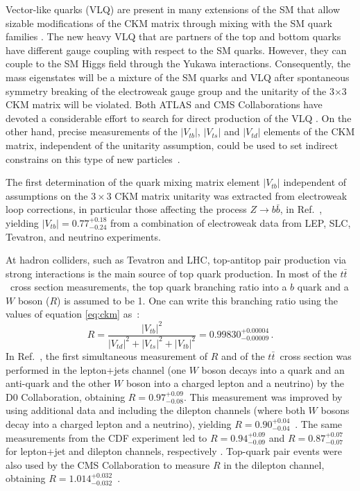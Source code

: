 \documentclass[11pt]{article}
\newcommand{\VTD}{|V_{td}|}
\newcommand{\VTS}{|V_{ts}|}
\newcommand{\VTB}{|V_{tb}|}
\newcommand{\ttbar}{$t\bar{t}$~}
\begin{document}
Vector-like quarks (VLQ)  are present in many extensions of the SM that allow sizable modifications of the CKM matrix through mixing with the SM quark families \cite{Cacciapaglia:2015ixa,Cacciapaglia:2011fx}. The new heavy VLQ that are partners of the top and bottom quarks have different gauge coupling with respect to the SM quarks. However, they can couple to the SM Higgs field through the Yukawa interactions. Consequently, the mass eigenstates  will be a mixture of the SM quarks and VLQ after spontaneous symmetry breaking of the electroweak gauge group and the unitarity of the 3$\times$3 CKM matrix will be violated. Both ATLAS and CMS Collaborations have devoted a considerable effort to search for direct production of the VLQ \cite{twikiATLAS,twikiCMS}. On the other hand, precise measurements of the   $\VTB$, $\VTS$ and $\VTD$ elements of the CKM matrix, independent of the unitarity assumption, could be used to set indirect constrains on this type of new particles~\cite{Cacciapaglia:2015ixa,Cacciapaglia:2011fx}.

The first determination of the quark mixing matrix element $\VTB$ independent of assumptions on the  $3\times 3$ CKM matrix
 unitarity was extracted from electroweak loop corrections, in particular those affecting the process $Z\rightarrow b\bar b$, in Ref.~\cite{Swain:1997mx}, yielding $\VTB = 0.77^{+0.18}_{-0.24}$  from a combination of electroweak data  from  LEP,  SLC,  Tevatron, and  neutrino  experiments.

 At hadron colliders, such as Tevatron and LHC,  top-antitop pair production via strong interactions is  the main source of top quark production. In most of the \ttbar  cross section measurements, the top quark branching ratio into a $b$ quark and a $W$ boson ($R$) is assumed to be 1. One can write this branching ratio using the values of equation \ref{eq:ckm} as~\cite{Patrignani:2016xqp}:
 \begin{equation}
R=\frac{|V_{tb}|^{2}}{|V_{td}|^{2}+|V_{ts}|^{2}+|V_{tb}|^{2}}=0.99830^{+0.00004}_{-0.00009} \,.
\end{equation}
In Ref.~\cite{Abazov:2008yn}, the first simultaneous measurement of $R$ and of the \ttbar  cross section was performed in  the lepton+jets channel (one $W$ boson decays  into a quark and an anti-quark and the other
$W$ boson into a charged lepton and a neutrino) by the D0 Collaboration, obtaining $R = 0.97^{+0.09}_{-0.08}$.
This measurement was improved by using additional  data and including the dilepton channels (where both $W$ bosons decay into a charged lepton and a neutrino), yielding $R = 0.90^{+0.04}_{-0.04}$~\cite{Abazov:2011zk}. The same measurements from the CDF experiment led to $R = 0.94^{+0.09}_{-0.09}$ and $R = 0.87^{+0.07}_{-0.07}$ for lepton+jet and dilepton channels, respectively \cite{Aaltonen:2013luz,Aaltonen:2014yua}. Top-quark pair events were also used by the CMS Collaboration to measure $R$ in the dilepton channel, obtaining $R = 1.014^{+0.032}_{-0.032}$~\cite{Khachatryan:2014nda}.
\end{document}
